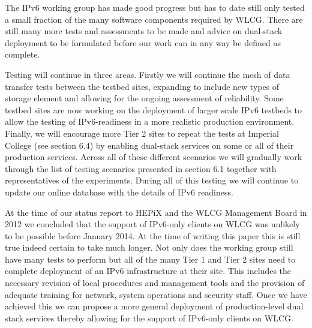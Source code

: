 The IPv6 working group has made good progress but has to date still only tested a small fraction of the many 
software components required by WLCG. There are still many more tests and 
assessments to be made and advice on dual-stack deployment to be formulated before 
our work can in any way be defined as complete.

Testing will continue in three areas. Firstly we will continue the mesh of data transfer tests between
the testbed sites, expanding to include new types of storage element and allowing for the ongoing
assessment of reliability. Some testbed sites are now working on the deployment of larger scale IPv6 testbeds
to allow the testing of IPv6-readiness in a more realistic production environment. Finally, we will encourage 
more Tier 2 sites to repeat the
tests at Imperial College (see section 6.4) by enabling dual-stack services on some or all of their production
services. Across all of these different scenarios we will gradually work through the list of testing scenarios presented
in section 6.1 together with representatives of the experiments.  During all of this testing we
will continue to update our online database with the details of IPv6 readiness.

At the time of our status report to HEPiX and the WLCG Management Board in 2012 we concluded that
the support of IPv6-only clients on WLCG was unlikely to be possible before January 2014. At the time of writing this
paper this is still true indeed certain to take much longer. Not only does the working group still have many tests to perform
but all of the many Tier 1 and Tier 2 sites need to complete deployment of an IPv6 infrastructure at their site. This includes
the necessary revision of local procedures and management tools and the provision of adequate training for network,
system operations and security staff. Once we have achieved this we can propose a more general deployment of 
production-level dual stack services thereby allowing for the support of IPv6-only clients on WLCG.

